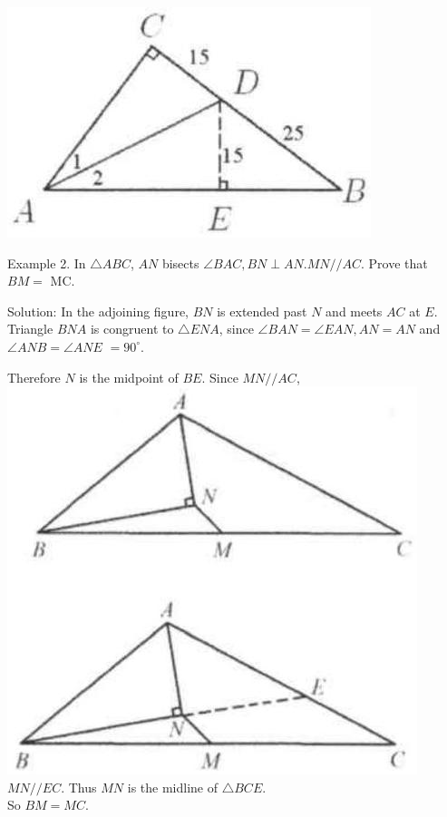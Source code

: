\documentclass[10pt]{article}
\begin{document}
\begin{center}
\includegraphics[max width=\textwidth]{2025_04_17_97bc1f7e44d93c271a88g-055(3)}
\end{center}

Example 2. In \(\triangle A B C\), \(A N\) bisects \(\angle B A C, B N \perp A N . M N / / A C\). Prove that \(B M=\) MC.

Solution:
In the adjoining figure, \(B N\) is extended past \(N\) and meets \(A C\) at \(E\). Triangle \(B N A\) is congruent to \(\triangle E N A\), since \(\angle B A N=\angle E A N, A N=A N\) and \(\angle A N B=\angle A N E\) \(=90^{\circ}\).

Therefore \(N\) is the midpoint of \(B E\). Since \(M N / / A C\),\\
\includegraphics[max width=\textwidth]{2025_04_17_97bc1f7e44d93c271a88g-055(1)} \(M N / / E C\). Thus \(M N\) is the midline of \(\triangle B C E\).\\
So \(B M=M C\).
\end{document}
